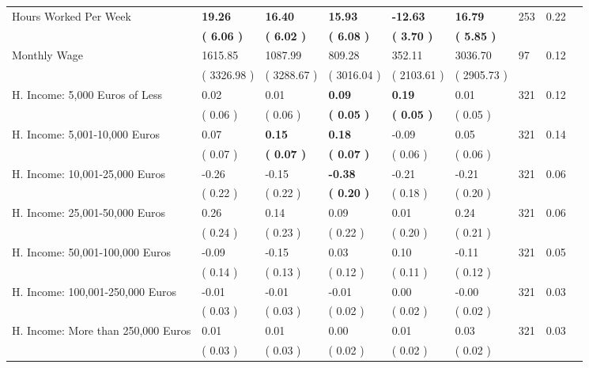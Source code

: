\begin{tabular}{L{6.2cm} C{1.8cm} C{1.8cm} C{1.8cm} C{1.8cm} C{1.8cm} C{1.8cm} C{0.3cm} C{0.3cm}}
Hours Worked Per Week & \textbf{    19.26} & \textbf{    16.40} & \textbf{    15.93} & \textbf{   -12.63} & \textbf{    16.79}  & 253 &       0.22 \\ 
 & \textbf{(     6.06 )} & \textbf{(     6.02 )} & \textbf{(     6.08 )} & \textbf{(     3.70 )} & \textbf{(     5.85 )}  & \\
Monthly Wage &   1615.85 &   1087.99 &    809.28 &    352.11 &   3036.70  & 97 &       0.12 \\ 
 & (  3326.98 ) & (  3288.67 ) & (  3016.04 ) & (  2103.61 ) & (  2905.73 )  & \\
H. Income: 5,000 Euros of Less &      0.02 &      0.01 & \textbf{     0.09} & \textbf{     0.19} &      0.01  & 321 &       0.12 \\ 
 & (     0.06 ) & (     0.06 ) & \textbf{(     0.05 )} & \textbf{(     0.05 )} & (     0.05 )  & \\
H. Income: 5,001-10,000 Euros &      0.07 & \textbf{     0.15} & \textbf{     0.18} &     -0.09 &      0.05  & 321 &       0.14 \\ 
 & (     0.07 ) & \textbf{(     0.07 )} & \textbf{(     0.07 )} & (     0.06 ) & (     0.06 )  & \\
H. Income: 10,001-25,000 Euros &     -0.26 &     -0.15 & \textbf{    -0.38} &     -0.21 &     -0.21  & 321 &       0.06 \\ 
 & (     0.22 ) & (     0.22 ) & \textbf{(     0.20 )} & (     0.18 ) & (     0.20 )  & \\
H. Income: 25,001-50,000 Euros &      0.26 &      0.14 &      0.09 &      0.01 &      0.24  & 321 &       0.06 \\ 
 & (     0.24 ) & (     0.23 ) & (     0.22 ) & (     0.20 ) & (     0.21 )  & \\
H. Income: 50,001-100,000 Euros &     -0.09 &     -0.15 &      0.03 &      0.10 &     -0.11  & 321 &       0.05 \\ 
 & (     0.14 ) & (     0.13 ) & (     0.12 ) & (     0.11 ) & (     0.12 )  & \\
H. Income: 100,001-250,000 Euros &     -0.01 &     -0.01 &     -0.01 &      0.00 &     -0.00  & 321 &       0.03 \\ 
 & (     0.03 ) & (     0.03 ) & (     0.02 ) & (     0.02 ) & (     0.02 )  & \\
H. Income: More than 250,000 Euros &      0.01 &      0.01 &      0.00 &      0.01 &      0.03  & 321 &       0.03 \\ 
 & (     0.03 ) & (     0.03 ) & (     0.02 ) & (     0.02 ) & (     0.02 )  & \\
\bottomrule
\end{tabular}
